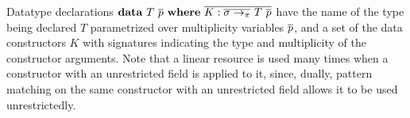 \documentclass[acmsmall,review,anonymous,screen]{acmart}
\begin{document}

Datatype declarations $\mathbf{data}~T~\overline{p}~\mathbf{where}~\overline{K:\overline{\sigma
\to_\pi}~T~\overline{p} }$ have the name of the type being declared $T$
parametrized over multiplicity variables $\overline{p}$, and a set of the data
constructors $K$ with signatures indicating the type and multiplicity of the
constructor arguments. Note that a linear resource is used many times when a
constructor with an unrestricted field is applied to it, since, dually, pattern
matching on the same constructor with an unrestricted field allows it to be
used unrestrictedly.

\SyntaxFull


\end{document}
